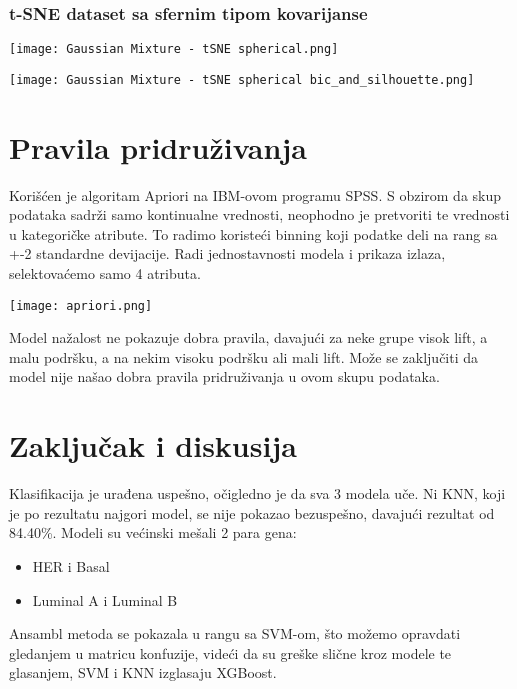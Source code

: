 \documentclass[a4paper]{article}
\begin{document}
        \newpage
        \subsubsection{t-SNE dataset sa sfernim tipom kovarijanse}
        \begin{center}
            \label{im:Gaussian Mixture - spherical}
            \texttt{[image: Gaussian Mixture - tSNE spherical.png]}
        \end{center}
        \begin{center}
            \label{im:Gaussian Mixture - spherical}
            \texttt{[image: Gaussian Mixture - tSNE spherical bic\_and\_silhouette.png]}
        \end{center}

        \newpage

\section{Pravila pridruživanja}
    Korišćen je algoritam Apriori na IBM-ovom programu SPSS. S obzirom da skup podataka sadrži samo kontinualne vrednosti, neophodno je pretvoriti te vrednosti u kategoričke atribute. To radimo koristeći binning koji podatke deli na rang sa +-2 standardne devijacije. Radi jednostavnosti modela i prikaza izlaza, selektovaćemo samo 4 atributa.

    \begin{center}
            \label{im:Associtation Rules - Apriori}
            \texttt{[image: apriori.png]}
        \end{center}

    Model nažalost ne pokazuje dobra pravila, davajući za neke grupe visok lift, a malu podršku, a na nekim visoku podršku ali mali lift. Može se zaključiti da model nije našao dobra pravila pridruživanja u ovom skupu podataka.
    
\section{Zaključak i diskusija}
        Klasifikacija je urađena uspešno, očigledno je da sva 3 modela uče. Ni KNN, koji je po rezultatu najgori model, se nije pokazao bezuspešno, davajući rezultat od 84.40\%. Modeli su većinski mešali 2 para gena:
        \begin{itemize}
            \item HER i Basal
            \item Luminal A i Luminal B
        \end{itemize}
        Ansambl metoda se pokazala u rangu sa SVM-om, što možemo opravdati gledanjem u matricu konfuzije, videći da su greške slične kroz modele te glasanjem, SVM i KNN izglasaju XGBoost.
        
\end{document}

